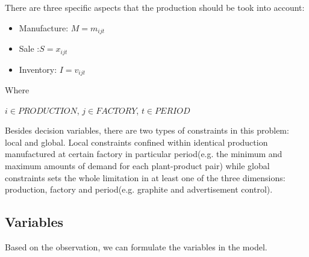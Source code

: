 \documentclass[12pt]{article}
\begin{document}
\begin{itemize}
    There are three specific aspects that the production should be took into account:
    \begin{itemize}
        \item Manufacture: $M = m_{ijt}$
        \item Sale :$S = x_{ijt}$
        \item Inventory: $I = v_{ijt}$
    \end{itemize}
Where

$i \in PRODUCTION$,
$j \in FACTORY$,
$t \in PERIOD$

\end{itemize}
\par

Besides decision variables, there are two types of constraints in this problem: local and global. Local constraints confined within identical production manufactured at certain factory in particular period(e.g. the minimum and maximum amounts of demand for each plant-product pair) while global constraints sets the whole limitation in at least one of the three dimensions: production, factory and period(e.g. graphite and advertisement control).
\par

\subsection{Variables}

Based on the observation, we can formulate the variables in the model.
\end{document}
